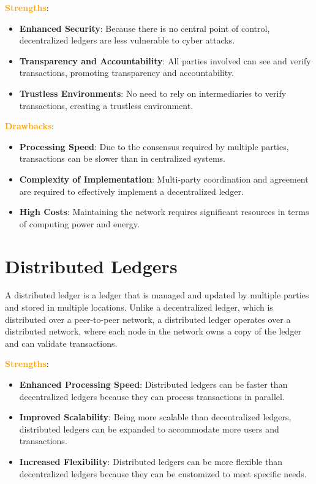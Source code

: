 \textbf{\textcolor{Orange}{Strengths}}:
\begin{itemize}
\item \textbf{Enhanced Security}: Because there is no central point of control, decentralized ledgers are less vulnerable to cyber attacks.
\item \textbf{Transparency and Accountability}: All parties involved can see and verify transactions, promoting transparency and accountability.
\item \textbf{Trustless Environments}: No need to rely on intermediaries to verify transactions, creating a trustless environment.
\end{itemize}

\vspace{2cm}

\textbf{\textcolor{Orange}{Drawbacks}}:
\begin{itemize}
\item \textbf{Processing Speed}: Due to the consensus required by multiple parties, transactions can be slower than in centralized systems.
\item \textbf{Complexity of Implementation}: Multi-party coordination and agreement are required to effectively implement a decentralized ledger.
\item \textbf{High Costs}: Maintaining the network requires significant resources in terms of computing power and energy.
\end{itemize}

\section{Distributed Ledgers}

A distributed ledger is a ledger that is managed and updated by multiple parties and stored in multiple locations. Unlike a decentralized ledger, which is distributed over a peer-to-peer network, a distributed ledger operates over a distributed network, where each node in the network owns a copy of the ledger and can validate transactions.

\textbf{\textcolor{Orange}{Strengths}}:

\begin{itemize}
    \item \textbf{Enhanced Processing Speed}: Distributed ledgers can be faster than decentralized ledgers because they can process transactions in parallel.
    \item \textbf{Improved Scalability}: Being more scalable than decentralized ledgers, distributed ledgers can be expanded to accommodate more users and transactions.
    \item \textbf{Increased Flexibility}: Distributed ledgers can be more flexible than decentralized ledgers because they can be customized to meet specific needs.
\end{itemize}


